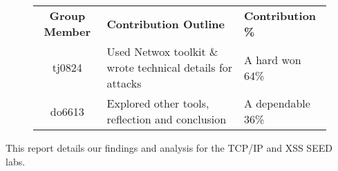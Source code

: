 \begin{figure}[h]
\centering
\begin{tabular}{|c|p{9.5cm}|l|}
\hline
{\bf Group Member} & {\bf Contribution Outline} & {\bf Contribution \%} \\
\hhline{|=|=|=|}
tj0824 & Used Netwox toolkit \& wrote technical details for attacks & A hard won 64\% \\
\hline
do6613 & Explored other tools, reflection and conclusion & A dependable 36\% \\
\hline
\end{tabular}
\end{figure}

This report details our findings and analysis for the TCP/IP and XSS SEED labs.